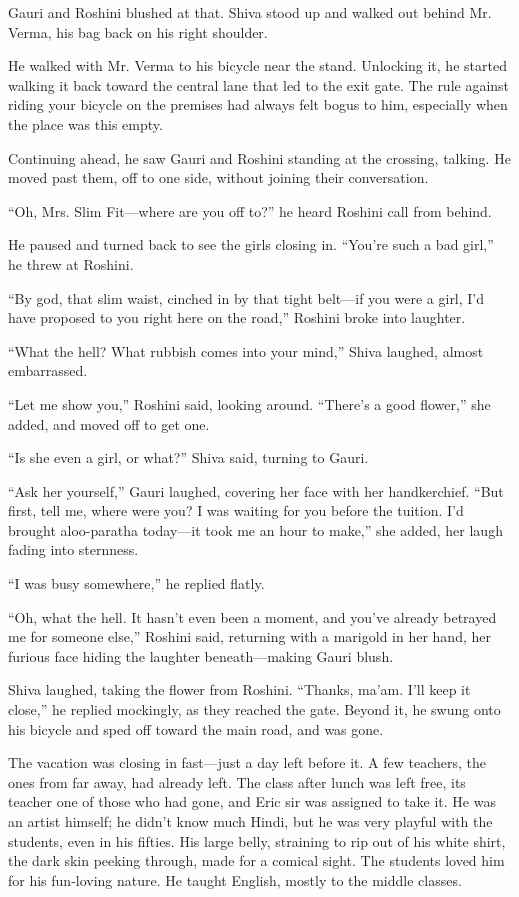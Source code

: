 Gauri and Roshini blushed at that. Shiva stood up and walked out behind Mr. Verma, his bag back on his right shoulder.

He walked with Mr. Verma to his bicycle near the stand. Unlocking it, he started walking it back toward the central lane that led to the exit gate. The rule against riding your bicycle on the premises had always felt bogus to him, especially when the place was this empty.

Continuing ahead, he saw Gauri and Roshini standing at the crossing, talking. He moved past them, off to one side, without joining their conversation.

``Oh, Mrs. Slim Fit—where are you off to?'' he heard Roshini call from behind.

He paused and turned back to see the girls closing in. ``You're such a bad girl,'' he threw at Roshini.

``By god, that slim waist, cinched in by that tight belt—if you were a girl, I'd have proposed to you right here on the road,'' Roshini broke into laughter.

``What the hell? What rubbish comes into your mind,'' Shiva laughed, almost embarrassed.

``Let me show you,'' Roshini said, looking around. ``There's a good flower,'' she added, and moved off to get one.

``Is she even a girl, or what?'' Shiva said, turning to Gauri.

``Ask her yourself,'' Gauri laughed, covering her face with her handkerchief. ``But first, tell me, where were you? I was waiting for you before the tuition. I'd brought aloo-paratha today—it took me an hour to make,'' she added, her laugh fading into sternness.

``I was busy somewhere,'' he replied flatly.

``Oh, what the hell. It hasn't even been a moment, and you've already betrayed me for someone else,'' Roshini said, returning with a marigold in her hand, her furious face hiding the laughter beneath—making Gauri blush.

Shiva laughed, taking the flower from Roshini. ``Thanks, ma'am. I'll keep it close,'' he replied mockingly, as they reached the gate. Beyond it, he swung onto his bicycle and sped off toward the main road, and was gone.

The vacation was closing in fast—just a day left before it. A few teachers, the ones from far away, had already left. The class after lunch was left free, its teacher one of those who had gone, and Eric sir was assigned to take it. He was an artist himself; he didn't know much Hindi, but he was very playful with the students, even in his fifties. His large belly, straining to rip out of his white shirt, the dark skin peeking through, made for a comical sight. The students loved him for his fun-loving nature. He taught English, mostly to the middle classes.

